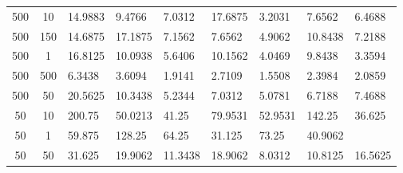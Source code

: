 \begin{table*}
\begin{center}
\begin{tabular}{cc|lllllll}
500&10&  14.9883& 9.4766&  7.0312& 17.6875&  3.2031&7.6562&  6.4688\\
500&150&  14.6875& 17.1875&  7.1562& 7.6562&  4.9062&10.8438&  7.2188\\
500&1&  16.8125& 10.0938&  5.6406& 10.1562&  4.0469&9.8438&  3.3594\\
500&500&  6.3438& 3.6094&  1.9141& 2.7109&  1.5508&2.3984&  2.0859\\
500&50&  20.5625& 10.3438&  5.2344& 7.0312&  5.0781&6.7188&  7.4688\\
50&10&  200.75& 50.0213&  41.25& 79.9531&  52.9531&142.25&  36.625\\
50&1&  59.875& 128.25&  64.25& 31.125&  73.25&40.9062&\\
50&50&  31.625& 19.9062&  11.3438& 18.9062&  8.0312& 10.8125&  16.5625\\ \hline
\end{tabular}
\end{center}
\end{table*}
